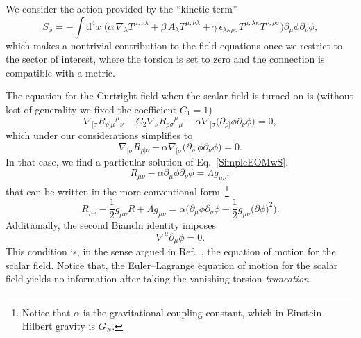 \documentclass[aps,prd,12pt,twocolumn,superscriptaddress,showpacs,showkeys,reprint%
]{revtex4-1}
\newcommand\pa[1]{\partial_{{#1}}}
\renewcommand{\(}{\left(}
\renewcommand{\)}{\right)}
\renewcommand{\[}{\left[}
\renewcommand{\]}{\right]}
\newcommand{\dn}[2]{{\mathrm{d}}^{#1}{#2}\;}
\newcommand{\hl}[1]{{\color{red} \bfseries{#1}}}
\begin{document}
We consider the action provided by the ``kinetic term''
\begin{dmath}
  \label{ScalarAction}
  S_\phi = -  \int \dn{4}{x} \Big( \alpha \, \nabla_\lambda T^{\mu,\nu\lambda}  + \beta \, A_\lambda T^{\mu,\nu\lambda} + \gamma \, \epsilon_{\lambda\kappa\rho\sigma} T^{\mu, \lambda\kappa} T^{\nu, \rho\sigma} \Big) \partial_\mu\phi\partial_\nu\phi,
\end{dmath}
which makes a nontrivial contribution to the field equations once we restrict to the sector of interest, where the torsion is set to zero and the connection is compatible with a metric.

The equation for the Curtright field when the scalar field is turned on is (without lost of generality we fixed the coefficient $C_1 = 1$)
\begin{equation*}
  \nabla_{[\sigma} R_{\rho]\mu}{}^{\mu}{}_\nu - {C_2} \nabla_\nu  R_{\rho\sigma}{}^{\mu}{}_\mu - \alpha \nabla_{[\sigma} \Big( \partial_{\rho]}\phi \partial_\nu\phi \Big) = 0,
\end{equation*}
which under our considerations simplifies to 
\begin{equation}
  \nabla_{[\sigma} R_{\rho]\nu} - \alpha \nabla_{[\sigma} \Big( \partial_{\rho]}\phi \partial_\nu\phi \Big) = 0.
  \label{SimpleEOMwS}
\end{equation}
In that case, we find a particular solution of Eq.~\eqref{SimpleEOMwS},%
\begin{equation*}
  R_{\mu\nu} - \alpha \pa{\mu} \phi \pa{\nu} \phi = \Lambda g_{\mu\nu},
\end{equation*}
that can be written in the more conventional form~\footnote{Notice that $\alpha$ is the gravitational coupling constant, which in Einstein--Hilbert gravity is $G_N$.}
\begin{equation}
  R_{\mu\nu} - \frac{1}{2} g_{\mu\nu} R + \Lambda g_{\mu\nu} = \alpha \Big( \pa{\mu} \phi \pa{\nu} \phi - \frac{1}{2} g_{\mu\nu} \big( \partial\phi \big)^2 \Big).
\end{equation}
Additionally, the second Bianchi identity imposes
\begin{equation}
  \nabla^\mu \pa{\mu} \phi = 0.
\end{equation}
This condition is, in the sense argued in Ref.~\cite{Bekenstein:2014uwa}, the equation of motion for the scalar field. Notice that, the Euler--Lagrange equation of motion for the scalar field yields no information after taking the vanishing torsion \emph{truncation}.
\end{document}
